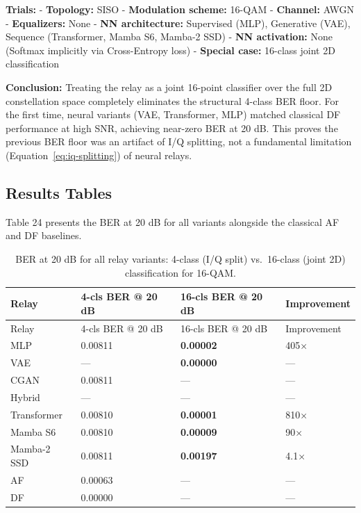 \documentclass[
  english,
  12pt,
  12pt,
  a4paper,
  oneside]{report}
\begin{document}
\textbf{Trials:} - \textbf{Topology:} SISO - \textbf{Modulation scheme:} 16-QAM - \textbf{Channel:} AWGN - \textbf{Equalizers:} None - \textbf{NN architecture:} Supervised (MLP), Generative (VAE), Sequence (Transformer, Mamba S6, Mamba-2 SSD) - \textbf{NN activation:} None (Softmax implicitly via Cross-Entropy loss) - \textbf{Special case:} 16-class joint 2D classification

\textbf{Conclusion:} Treating the relay as a joint 16-point classifier over the full 2D constellation space completely eliminates the structural 4-class BER floor. For the first time, neural variants (VAE, Transformer, MLP) matched classical DF performance at high SNR, achieving near-zero BER at 20 dB. This proves the previous BER floor was an artifact of I/Q splitting, not a fundamental limitation (Equation~\ref{eq:iq-splitting}) of neural relays.

\subsection{Results Tables}\label{sec:results-tables-5}

Table 24 presents the BER at 20 dB for all variants alongside the classical AF and DF baselines.

\begin{longtable}[]{@{}llll@{}}
\caption{BER at 20 dB for all relay variants: 4-class (I/Q split) vs.~16-class (joint 2D) classification for 16-QAM.}\label{tbl:table24}\tabularnewline
\toprule\noalign{}
Relay & 4-cls BER @ 20 dB & 16-cls BER @ 20 dB & Improvement \\
\midrule\noalign{}
\endfirsthead
\toprule\noalign{}
Relay & 4-cls BER @ 20 dB & 16-cls BER @ 20 dB & Improvement \\
\midrule\noalign{}
\endhead
\bottomrule\noalign{}
\endlastfoot
MLP & 0.00811 & \textbf{0.00002} & 405× \\
VAE & --- & \textbf{0.00000} & --- \\
CGAN & 0.00811 & --- & --- \\
Hybrid & --- & --- & --- \\
Transformer & 0.00810 & \textbf{0.00001} & 810× \\
Mamba S6 & 0.00810 & \textbf{0.00009} & 90× \\
Mamba-2 SSD & 0.00811 & \textbf{0.00197} & 4.1× \\
AF & 0.00063 & --- & --- \\
DF & 0.00000 & --- & --- \\
\end{longtable}
\end{document}
